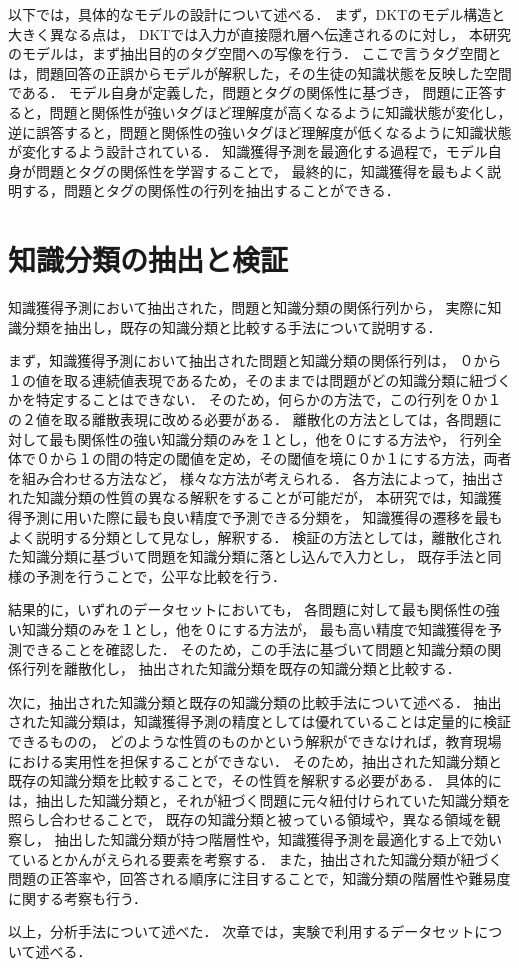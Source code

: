 以下では，具体的なモデルの設計について述べる．
まず，DKTのモデル構造と大きく異なる点は，
DKTでは入力が直接隠れ層へ伝達されるのに対し，
本研究のモデルは，まず抽出目的のタグ空間への写像を行う．
ここで言うタグ空間とは，問題回答の正誤からモデルが解釈した，その生徒の知識状態を反映した空間である．
モデル自身が定義した，問題とタグの関係性に基づき，
問題に正答すると，問題と関係性が強いタグほど理解度が高くなるように知識状態が変化し，
逆に誤答すると，問題と関係性の強いタグほど理解度が低くなるように知識状態が変化するよう設計されている．
知識獲得予測を最適化する過程で，モデル自身が問題とタグの関係性を学習することで，
最終的に，知識獲得を最もよく説明する，問題とタグの関係性の行列を抽出することができる．


\section{知識分類の抽出と検証}
知識獲得予測において抽出された，問題と知識分類の関係行列から，
実際に知識分類を抽出し，既存の知識分類と比較する手法について説明する．

まず，知識獲得予測において抽出された問題と知識分類の関係行列は，
０から１の値を取る連続値表現であるため，そのままでは問題がどの知識分類に紐づくかを特定することはできない．
そのため，何らかの方法で，この行列を０か１の２値を取る離散表現に改める必要がある．
離散化の方法としては，各問題に対して最も関係性の強い知識分類のみを１とし，他を０にする方法や，
行列全体で０から１の間の特定の閾値を定め，その閾値を境に０か１にする方法，両者を組み合わせる方法など，
様々な方法が考えられる．
各方法によって，抽出された知識分類の性質の異なる解釈をすることが可能だが，
本研究では，知識獲得予測に用いた際に最も良い精度で予測できる分類を，
知識獲得の遷移を最もよく説明する分類として見なし，解釈する．
検証の方法としては，離散化された知識分類に基づいて問題を知識分類に落とし込んで入力とし，
既存手法と同様の予測を行うことで，公平な比較を行う．

結果的に，いずれのデータセットにおいても，
各問題に対して最も関係性の強い知識分類のみを１とし，他を０にする方法が，
最も高い精度で知識獲得を予測できることを確認した．
そのため，この手法に基づいて問題と知識分類の関係行列を離散化し，
抽出された知識分類を既存の知識分類と比較する．


次に，抽出された知識分類と既存の知識分類の比較手法について述べる．
抽出された知識分類は，知識獲得予測の精度としては優れていることは定量的に検証できるものの，
どのような性質のものかという解釈ができなければ，教育現場における実用性を担保することができない．
そのため，抽出された知識分類と既存の知識分類を比較することで，その性質を解釈する必要がある．
具体的には，抽出した知識分類と，それが紐づく問題に元々紐付けられていた知識分類を照らし合わせることで，
既存の知識分類と被っている領域や，異なる領域を観察し，
抽出した知識分類が持つ階層性や，知識獲得予測を最適化する上で効いているとかんがえられる要素を考察する．
また，抽出された知識分類が紐づく問題の正答率や，回答される順序に注目することで，知識分類の階層性や難易度に関する考察も行う．


\vvspace
以上，分析手法について述べた．
次章では，実験で利用するデータセットについて述べる．

